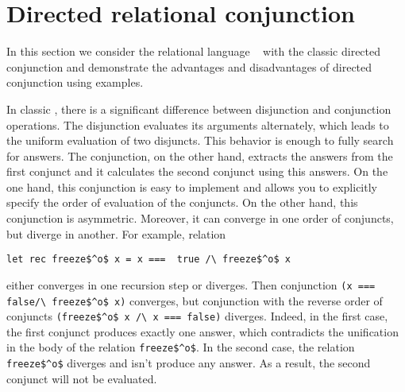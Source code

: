 \section{Directed relational conjunction}

In this section we consider the relational language \mk~ with the classic directed conjunction and demonstrate the advantages and disadvantages of directed conjunction using examples.

In classic \mk, there is a significant difference between disjunction and conjunction operations.
The disjunction evaluates its arguments alternately, which leads to the uniform evaluation of two disjuncts.
This behavior is enough to fully search for answers.
The conjunction, on the other hand, extracts the answers from the first conjunct and it calculates the second conjunct using this answers.
On the one hand, this conjunction is easy to implement and allows you to explicitly specify the order of evaluation of the conjuncts.
On the other hand, this conjunction is asymmetric.
Moreover, it can converge in one order of conjuncts, but diverge in another.
For example, relation
\begin{lstlisting}
let rec freeze$^o$ x = x ===  true /\ freeze$^o$ x
\end{lstlisting}
either converges in one recursion step or diverges.
Then conjunction \lstinline{(x === false/\ freeze$^o$ x)} converges, but conjunction with the reverse order of conjuncts \lstinline{(freeze$^o$ x /\ x === false)} diverges.
Indeed, in the first case, the first conjunct produces exactly one answer, which contradicts the unification in the body of the relation \lstinline{freeze$^o$}. In the second case, the relation \lstinline{freeze$^o$} diverges and isn't produce any answer. As a result, the second conjunct will not be evaluated.

